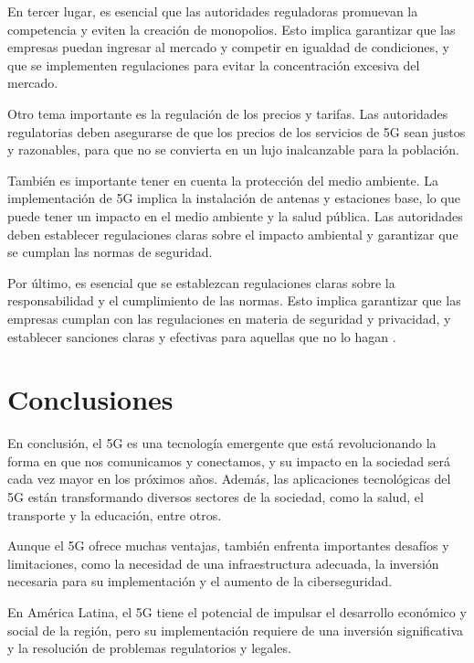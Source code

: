 \documentclass[12pt]{article}
\begin{document}
            En tercer lugar, es esencial que las autoridades reguladoras promuevan la competencia y eviten la creación de monopolios. Esto implica garantizar que las empresas puedan ingresar al mercado y competir en igualdad de condiciones, y que se implementen regulaciones para evitar la concentración excesiva del mercado.
            
            Otro tema importante es la regulación de los precios y tarifas. Las autoridades regulatorias deben asegurarse de que los precios de los servicios de 5G sean justos y razonables, para que no se convierta en un lujo inalcanzable para la población.
            
            También es importante tener en cuenta la protección del medio ambiente. La implementación de 5G implica la instalación de antenas y estaciones base, lo que puede tener un impacto en el medio ambiente y la salud pública. Las autoridades deben establecer regulaciones claras sobre el impacto ambiental y garantizar que se cumplan las normas de seguridad.
            
            Por último, es esencial que se establezcan regulaciones claras sobre la responsabilidad y el cumplimiento de las normas. Esto implica garantizar que las empresas cumplan con las regulaciones en materia de seguridad y privacidad, y establecer sanciones claras y efectivas para aquellas que no lo hagan \cite{ramos2020consideraciones}.

    \section{Conclusiones}

        En conclusión, el 5G es una tecnología emergente que está revolucionando la forma en que nos comunicamos y conectamos, y su impacto en la sociedad será cada vez mayor en los próximos años. Además, las aplicaciones tecnológicas del 5G están transformando diversos sectores de la sociedad, como la salud, el transporte y la educación, entre otros.
        
        Aunque el 5G ofrece muchas ventajas, también enfrenta importantes desafíos y limitaciones, como la necesidad de una infraestructura adecuada, la inversión necesaria para su implementación y el aumento de la ciberseguridad.
        
        En América Latina, el 5G tiene el potencial de impulsar el desarrollo económico y social de la región, pero su implementación requiere de una inversión significativa y la resolución de problemas regulatorios y legales.
        
\end{document}
